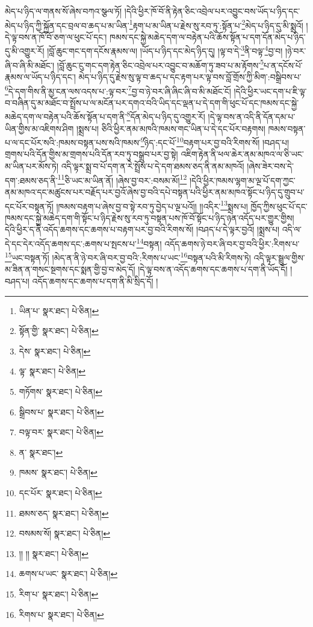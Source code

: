 མེད་པ་ཉིད་ལ་གནས་སོ་ཞེས་བཀའ་སྩལ་ཏོ། །དེའི་ཕྱིར་ཁོ་བོ་ནི་རྟེན་ཅིང་འབྲེལ་པར་འབྱུང་བས་ཡོད་པ་ཉིད་དང་མེད་པ་ཉིད་ཀྱི་སྐྱོན་དང་བྲལ་བ་ཆད་པ་མ་ཡིན་\footnote{ཡིན་པ་  སྣར་ཐང་།  པེ་ཅིན། }རྟག་པ་མ་ཡིན་པ་རྗེས་སུ་རབ་ཏུ་:སྟོན་པ་\footnote{སྟོན་གྱི་  སྣར་ཐང་།  པེ་ཅིན། }མེད་པ་ཉིད་དུ་མི་སྨྲའོ། །དེ་ལྟ་བས་ན་ཁོ་བོ་ཅག་ལ་ཕུང་པོ་དང་། ཁམས་དང་སྐྱེ་མཆེད་དག་ལ་བརྟེན་པའི་ཆོས་སྟོན་པ་དག་དོན་མེད་པ་ཉིད་དུ་མི་འགྱུར་རོ། །བློ་ཆུང་གང་དག་དངོས་རྣམས་ལ། །ཡོད་པ་ཉིད་དང་མེད་ཉིད་དུ། །ལྟ་བ་དེ་\footnote{དེས་  སྣར་ཐང་།  པེ་ཅིན། }ནི་བལྟ་\footnote{ལྟ་  སྣར་ཐང་།  པེ་ཅིན། }བྱ་བ། །ཉེ་བར་ཞི་བ་ཞི་མི་མཐོང་། །བློ་ཆུང་ངུ་གང་དག་རྟེན་ཅིང་འབྲེལ་པར་འབྱུང་བ་མཆོག་ཏུ་ཟབ་པ་མ་རྟོགས་\footnote{གཏོགས་  སྣར་ཐང་།  པེ་ཅིན། }པ་ན་དངོས་པོ་རྣམས་ལ་ཡོད་པ་ཉིད་དང་། མེད་པ་ཉིད་དུ་རྗེས་སུ་ལྟ་བ་ཆད་པ་དང་རྟག་པར་ལྟ་བས་བློ་གྲོས་ཀྱི་མིག་:བསྒྲིབས་པ་\footnote{སྒྲིབས་པ་  སྣར་ཐང་།  པེ་ཅིན། }དེ་དག་གིས་ནི་མྱ་ངན་ལས་འདས་པ་:ལྟ་བར་\footnote{བལྟ་བར་  སྣར་ཐང་།  པེ་ཅིན། }བྱ་བ་ཉེ་བར་ཞི་ཞིང་ཞི་བ་མི་མཐོང་ངོ། །དེའི་ཕྱིར་ཡང་དག་པ་ཇི་ལྟ་བ་བཞིན་དུ་མ་མཐོང་བ་སྤྲོས་པ་ལ་མངོན་པར་དགའ་བའི་ཡིད་དང་ལྡན་པ་དེ་དག་གི་ཕུང་པོ་དང་ཁམས་དང་སྐྱེ་མཆེད་དག་ལ་བརྟེན་པའི་ཆོས་སྟོན་པ་དག་ནི་\footnote{ན་  སྣར་ཐང་། }དོན་མེད་པ་ཉིད་དུ་འགྱུར་རོ། །དེ་ལྟ་བས་ན་འདི་ནི་དོན་དམ་པ་ཡིན་གྱིས་མ་འཇིགས་ཤིག །སྨྲས་པ། ཅིའི་ཕྱིར་ནམ་མཁའི་ཁམས་གང་ཡིན་པ་དེ་དང་པོར་བརྟགས། ཁམས་བསྟན་པ་ལ་དང་པོར་སའི་:ཁམས་བསྟན་པས་སའི་ཁམས་\footnote{ཁམས་  སྣར་ཐང་།  པེ་ཅིན། }ཉིད་:དང་པོ་\footnote{དང་པོར་  སྣར་ཐང་།  པེ་ཅིན། }བརྟག་པར་བྱ་བའི་རིགས་སོ། །བཤད་པ། གྲགས་པའི་དོན་གྱིས་མ་གྲགས་པའི་དོན་རབ་ཏུ་བསྒྲུབ་པར་བྱ་སྟེ། འཇིག་རྟེན་ནི་ཕལ་ཆེར་ནམ་མཁའ་ལ་ཅི་ཡང་མ་ཡིན་པར་མོས་ཏེ། འདི་ལྟར་སྨྲ་བ་པོ་དག་ན་རེ་སྤྲོས་པ་དེ་དག་ཐམས་ཅད་ནི་ནམ་མཁའོ། །ཞེས་ཟེར་བས་དེ་དག་:ཐམས་ཅད་ནི་\footnote{ཐམས་ཅད་  སྣར་ཐང་།  པེ་ཅིན། }ཅི་ཡང་མ་ཡིན་ནོ། །ཞེས་བྱ་བར་:བསམ་མོ།\footnote{བསམས་སོ།  སྣར་ཐང་།  པེ་ཅིན། } །དེའི་ཕྱིར་ཁམས་ལྷག་མ་ལྔ་པོ་དག་ཀྱང་ནམ་མཁའ་དང་མཚུངས་པར་བརྗོད་པར་བྱའོ་ཞེས་བྱ་བའི་དཔེ་བསྟན་པའི་ཕྱིར་ནམ་མཁའ་སྟོང་པ་ཉིད་དུ་གྲུབ་པ་དང་པོར་བསྟན་ཏོ། །ཁམས་བརྟག་པ་ཞེས་བྱ་བ་སྟེ་རབ་ཏུ་བྱེད་པ་ལྔ་པའོ།། །།འདིར་\footnote{།། །།  སྣར་ཐང་།  པེ་ཅིན། }སྨྲས་པ། ཁྱོད་ཀྱིས་ཕུང་པོ་དང་ཁམས་དང་སྐྱེ་མཆེད་དག་གི་སྟོང་པ་ཉིད་རྗེས་སུ་རབ་ཏུ་བསྟན་པས་ཁོ་བོ་སྟོང་པ་ཉིད་ཉན་འདོད་པར་གྱུར་གྱིས། དེའི་ཕྱིར་ད་ནི་འདོད་ཆགས་དང་ཆགས་པ་བརྟག་པར་བྱ་བའི་རིགས་སོ། །བཤད་པ་དེ་ལྟར་བྱའོ། །སྨྲས་པ། འདི་ལ་དེ་དང་དེར་འདོད་ཆགས་དང་:ཆགས་པ་སྤངས་པ་\footnote{ཆགས་པ་ཡང་  སྣར་ཐང་།  པེ་ཅིན། }བསྟན། འདོད་ཆགས་ཉེ་བར་ཞི་བར་བྱ་བའི་ཕྱིར་:རིགས་པ་\footnote{རིག་པ་  སྣར་ཐང་།  པེ་ཅིན། }ཡང་བསྟན་ཏོ། །མེད་ན་ནི་ཉེ་བར་ཞི་བར་བྱ་བའི་:རིགས་པ་ཡང་\footnote{རིགས་པ་  སྣར་ཐང་།  པེ་ཅིན། }བསྟན་པའི་མི་རིགས་ཏེ། འདི་ལྟར་སྦྲུལ་གྱིས་མ་ཟིན་ན་གསང་སྔགས་དང་སྨན་གྱི་བྱ་བ་མེད་དོ། །དེ་ལྟ་བས་ན་འདོད་ཆགས་དང་ཆགས་པ་དག་ནི་ཡོད་དོ། །བཤད་པ། འདོད་ཆགས་དང་ཆགས་པ་དག་ནི་མི་སྲིད་དོ། །
